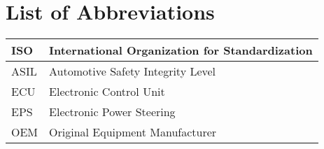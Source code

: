 \chapter{List of Abbreviations}
\label{ch:abbr}

\renewcommand{\arraystretch}{1.7}
\begin{tabular}{| L{3cm} | L{11cm} |}
\hline
ISO & International Organization for Standardization 
\\\hline
ASIL & Automotive Safety Integrity Level
\\\hline
ECU & Electronic Control Unit
\\\hline
EPS & Electronic Power Steering
\\\hline
OEM & Original Equipment Manufacturer
\\\hline
\end{tabular}

